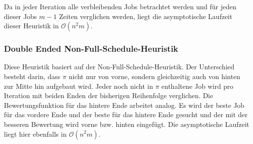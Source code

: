 \documentclass{scrreprt}
\begin{document}
Da in jeder Iteration alle verbleibenden Jobs betrachtet werden und für jeden dieser Jobs $m-1$ Zeiten verglichen werden,
liegt die asymptotische Laufzeit dieser Heuristik in $\mathcal{O}(n^2m)$.

\subsubsection{Double Ended Non-Full-Schedule-Heuristik}
Diese Heuristik basiert auf der Non-Full-Schedule-Heuristik.
Der Unterschied besteht darin, dass $\pi$ nicht nur von vorne, sondern gleichzeitig auch von hinten zur Mitte hin aufgebaut wird.
Jeder noch nicht in $\pi$ enthaltene Job wird pro Iteration mit beiden Enden der bisherigen Reihenfolge verglichen.
Die Bewertungsfunktion für das hintere Ende arbeitet analog.
Es wird der beste Job für das vordere Ende und der beste für das hintere Ende gesucht und der mit der besseren Bewertung wird vorne bzw. hinten eingefügt.
Die asymptotische Laufzeit liegt hier ebenfalls in $\mathcal{O}(n^2m)$.
\end{document}

